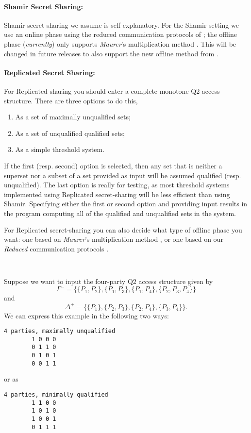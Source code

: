 \paragraph{Shamir Secret Sharing:}
Shamir secret sharing we assume is self-explanatory.
For the Shamir setting we use an online phase using the reduced communication
protocols of \cite{KRSW}; 
the offline phase ({\em currently}) only supports {\em Maurer}'s multiplication method
\cite{Maurer}.
This will be changed in future releases to also support the new offline method from
\cite{SW18}.


\paragraph{Replicated Secret Sharing:}
For Replicated sharing you should enter a complete monotone Q2 access structure.
There are three options to do this, 
\begin{enumerate}
\item As a set of maximally unqualified sets;
\item As a set of unqualified qualified sets;
\item As a simple threshold system.
\end{enumerate}
If the first (resp. second) option is selected, then any set that is neither 
a superset nor a subset of a set provided as input will be assumed qualified (resp. unqualified).
The last option is really for testing, as most 
threshold systems implemented using Replicated secret-sharing will be
less efficient than using Shamir.  
Specifying either the first or second option and providing input
results in the program computing all of the qualified and unqualified
sets in the system.  

For Replicated secret-sharing you
can also decide what type of offline phase you want: one based on
{\em Maurer}'s multiplication method \cite{Maurer}, 
or one based on our {\em Reduced} communication protocols \cite{KRSW}.

~~

\noindent
Suppose we want to input the four-party Q2 access structure given by
\[\Gamma^- = \{\{P_1, P_2\}, \{P_1, P_3\}, \{P_1, P_4\}, \{P_2, P_3, P_4\}\}\]
and
\[\Delta^+ = \{\{P_1\}, \{P_2, P_3\}, \{P_2, P_4\}, \{P_3, P_4\}\}.\]
We can express this example in the following two ways:
\begin{verbatim}
4 parties, maximally unqualified
        1 0 0 0
        0 1 1 0
        0 1 0 1
        0 0 1 1
\end{verbatim}
or as
\begin{verbatim}
4 parties, minimally qualified
        1 1 0 0
        1 0 1 0
        1 0 0 1
        0 1 1 1
\end{verbatim}

